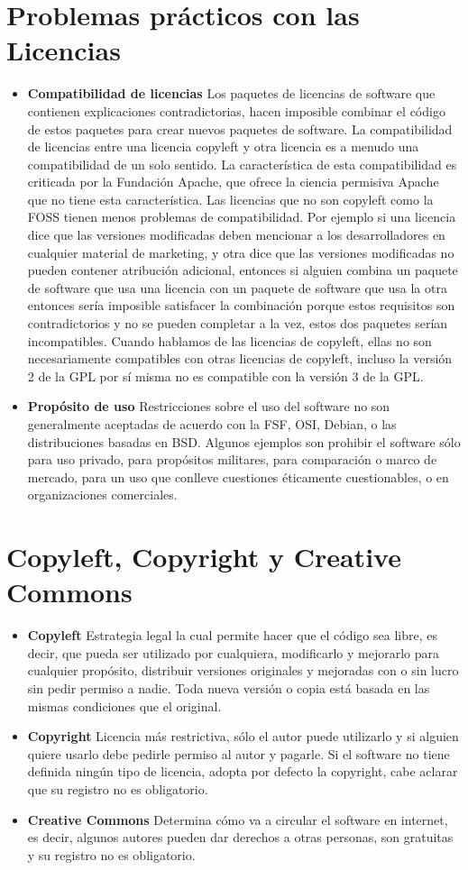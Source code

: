 \documentclass{article}
\begin{document}
\section {Problemas prácticos con las Licencias}
\begin{itemize}
	\item {\bf Compatibilidad de licencias}
Los paquetes de licencias de software que contienen explicaciones contradictorias, hacen imposible combinar el código de estos paquetes para crear nuevos paquetes de software. La compatibilidad de licencias entre una licencia copyleft y otra licencia es a menudo una compatibilidad de un solo sentido. La característica de esta compatibilidad es criticada por la Fundación Apache, que ofrece la ciencia permisiva Apache que no tiene esta característica. Las licencias que no son copyleft como la FOSS tienen menos problemas de compatibilidad. Por ejemplo si una licencia dice que las versiones modificadas deben mencionar a los desarrolladores en cualquier material de marketing, y otra dice que las versiones modificadas no pueden contener atribución adicional, entonces si alguien combina un paquete de software que usa una licencia con un paquete de software que usa la otra entonces sería imposible satisfacer la combinación porque estos requisitos son contradictorios y no se pueden completar a la vez, estos dos paquetes serían incompatibles. Cuando hablamos de las licencias de copyleft, ellas no son necesariamente compatibles con otras licencias de copyleft, incluso la versión 2 de la GPL por sí misma no es compatible con la versión 3 de la GPL.
	\item {\bf Propósito de uso}
Restricciones sobre el uso del software no son generalmente aceptadas de acuerdo con la FSF, OSI, Debian, o las distribuciones basadas en BSD. Algunos ejemplos son prohibir el software sólo para uso privado, para propósitos militares, para comparación o marco de mercado, para un uso que conlleve cuestiones éticamente cuestionables, o en organizaciones comerciales.
\end{itemize}
\newpage
\section {Copyleft, Copyright y Creative Commons}
\begin{itemize}
\item {\bf Copyleft}
Estrategia legal la cual permite hacer que el código sea libre, es decir, que pueda ser utilizado por cualquiera, modificarlo y mejorarlo para cualquier propósito, distribuir versiones originales y mejoradas con o sin lucro sin pedir permiso a nadie. Toda nueva versión o copia está basada en las mismas condiciones que el original.
\item {\bf Copyright}
Licencia más restrictiva, sólo el autor puede utilizarlo y si alguien quiere usarlo debe pedirle permiso al autor y pagarle. Si el software no tiene definida ningún tipo de licencia, adopta por defecto la copyright, cabe aclarar que su registro no es obligatorio. 
\item {\bf Creative Commons}
Determina cómo va a circular el software en internet, es decir, algunos autores pueden dar derechos a otras personas, son gratuitas y su registro no es obligatorio.
\end{itemize}
\newpage
\end{document}
